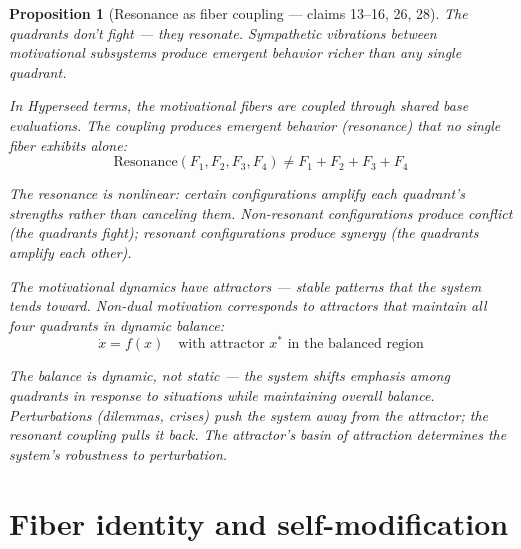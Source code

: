 \documentclass[11pt,a4paper]{article}
\newtheorem{proposition}[definition]{Proposition}
\begin{document}
\begin{proposition}[Resonance as fiber coupling --- claims 13--16, 26, 28]
\label{prop:resonance}
The quadrants don't fight --- they resonate. Sympathetic vibrations
between motivational subsystems produce emergent behavior richer than
any single quadrant.

In Hyperseed terms, the motivational fibers are coupled through shared
base evaluations. The coupling produces emergent behavior (resonance)
that no single fiber exhibits alone:
\[
  \text{Resonance}(F_1, F_2, F_3, F_4) \neq F_1 + F_2 + F_3 + F_4
\]

The resonance is nonlinear: certain configurations amplify each
quadrant's strengths rather than canceling them. Non-resonant
configurations produce conflict (the quadrants fight); resonant
configurations produce synergy (the quadrants amplify each other).

The motivational dynamics have \emph{attractors} --- stable patterns
that the system tends toward. Non-dual motivation corresponds to
attractors that maintain all four quadrants in dynamic balance:
\[
  \dot{x} = f(x) \quad \text{with attractor } x^*
  \text{ in the balanced region}
\]

The balance is dynamic, not static --- the system shifts emphasis among
quadrants in response to situations while maintaining overall balance.
Perturbations (dilemmas, crises) push the system away from the attractor;
the resonant coupling pulls it back. The attractor's basin of attraction
determines the system's robustness to perturbation.
\end{proposition}

\section{Fiber identity and self-modification}
\label{sec:dilemmas}
\end{document}

